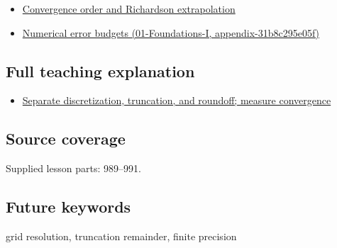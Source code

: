 \begin{itemize}
\tightlist
\item
  \hyperref[appendix-aca80b6bf17a]{Convergence order and Richardson extrapolation}
\item
  \href{../01-Foundations-I/main.pdf\#nameddest=appendix-31b8c295e05f}{Numerical error budgets (01-Foundations-I, appendix-31b8c295e05f)}
\end{itemize}

\subsection{Full teaching explanation}\label{appendix-6b0648b2b8e8-full-teaching-explanation}

\begin{itemize}
\tightlist
\item
  \hyperref[02-foundations-ii-ch029-separate-discretization-truncation-and-roundoff-measure-convergence]{Separate discretization, truncation, and roundoff; measure convergence}
\end{itemize}

\subsection{Source coverage}\label{appendix-6b0648b2b8e8-source-coverage}

Supplied lesson parts: 989--991.

\subsection{Future keywords}\label{appendix-6b0648b2b8e8-future-keywords}

grid resolution, truncation remainder, finite precision
